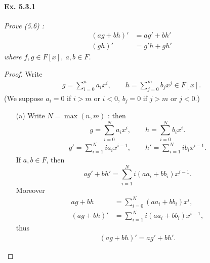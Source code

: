\documentclass[11pt,a4paper]{article}
\begin{document}
\paragraph{Ex. 5.3.1}

{\it Prove (5.6) :
\begin{align*}
(ag+bh)' &= ag'+bh'\\
(gh)'&= g'h+gh'
\end{align*}
where $f,g\in F[x],\ a,b \in F$.
}

\begin{proof}
Write 
\begin{align}
g = \sum_{i=0}^n a_i x^i,\qquad h= \sum_{j=0}^m b_j x^j \in F[x]. \label{eq5.3.1:1}
\end{align}
(We suppose $a_i=0$ if $i>m$ or $i<0$, $b_j=0$ if $j>m$ or $j<0$.)
\begin{enumerate}
\item[(a)]
Write $N = \max(n,m)$ : then $$g= \sum_{i=0}^N a_i x^i,\qquad h= \sum_{i=0}^N b_i x^i.$$
\begin{align*}
g' = \sum_{i=1}^N ia_i x^{i-1},\qquad h' = \sum_{i=1}^N ib_i x^{i-1}.
\end{align*}
If $a,b\in F$, then
$$ ag'+bh' = \sum_{i=1}^N i(aa_i+bb_i) x^{i-1}.$$
Moreover
\begin{align*}
ag+bh &= \sum_{i=0}^N(aa_i+bb_i) x^i,\\
(ag+bh)'&= \sum_{i=1}^Ni(aa_i+bb_i) x^{i-1},
\end{align*}
thus
\begin{align*}
(ag+bh)'=ag'+bh'.
\end{align*}


\end{enumerate}
\end{proof}
\end{document}
